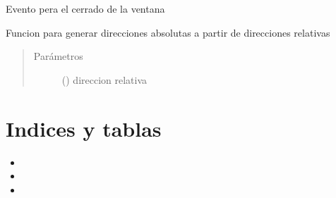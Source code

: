 \documentclass[letterpaper,10pt,spanish]{sphinxmanual}
\begin{document}
\begin{fulllineitems}
\begin{fulllineitems}
\begin{quote}
\begin{description}
\end{description}\end{quote}

\end{fulllineitems}


\begin{fulllineitems}
\label{\detokenize{codigos/Principal:main.MainWindow.closeEvent}}
Evento pera el cerrado de la ventana

\end{fulllineitems}


\begin{fulllineitems}
\label{\detokenize{codigos/Principal:main.MainWindow.resource_path}}
Funcion para generar direcciones absolutas a partir de direcciones relativas
\begin{quote}\begin{description}
\item[{Parámetros}] \leavevmode
{} () \textendash{} direccion relativa

\end{description}\end{quote}

\end{fulllineitems}


\end{fulllineitems}



\chapter{Indices y tablas}
\label{\detokenize{index:indices-y-tablas}}\begin{itemize}
\item {} 

\item {} 

\item {} 

\end{itemize}
\end{document}
